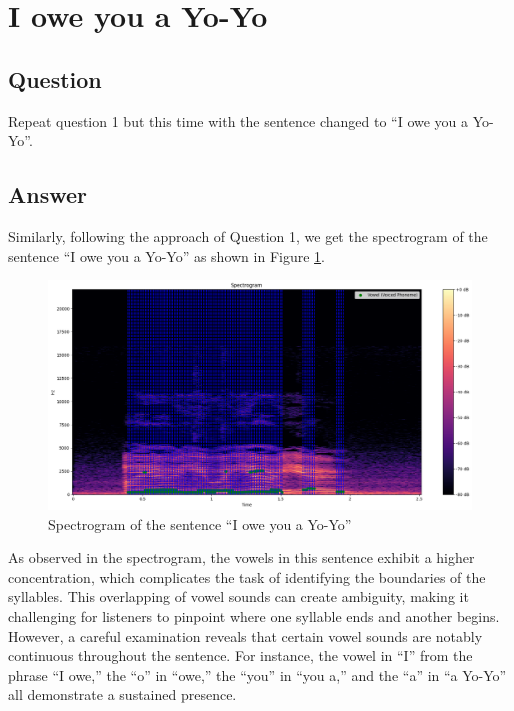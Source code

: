 
\section{I owe you a Yo-Yo}

\subsection{Question}
Repeat question 1 but this time with the sentence changed to ``I owe you a Yo-Yo''.

\subsection{Answer}
Similarly, following the approach of Question 1, we get the spectrogram of the sentence ``I owe you a Yo-Yo'' as shown in Figure \ref{fig:Question2}.

\begin{figure}[H]
    \centering
    \includegraphics[width=\textwidth]{./img/Q2-1.png}
    \caption{Spectrogram of the sentence ``I owe you a Yo-Yo''}
    \label{fig:Question2}
\end{figure}

As observed in the spectrogram, the vowels in this sentence exhibit a higher concentration, which complicates the task of identifying the boundaries of the syllables. This overlapping of vowel sounds can create ambiguity, making it challenging for listeners to pinpoint where one syllable ends and another begins. However, a careful examination reveals that certain vowel sounds are notably continuous throughout the sentence. For instance, the vowel in ``I'' from the phrase ``I owe,'' the ``o'' in ``owe,'' the ``you'' in ``you a,'' and the ``a'' in ``a Yo-Yo'' all demonstrate a sustained presence.

